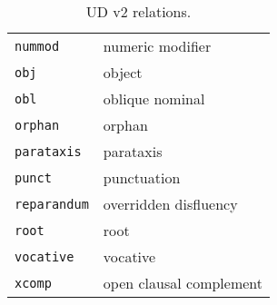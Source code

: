 \documentclass[11pt,a4paper]{article}
\begin{document}
\begin{table}[h]
\begin{tabular}{ll}
\texttt{nummod} & numeric modifier \\
\texttt{obj} & object \\
\texttt{obl} & oblique nominal \\
\texttt{orphan} & orphan \\
\texttt{parataxis} & parataxis \\
\texttt{punct} & punctuation \\
\texttt{reparandum} & overridden disfluency \\
\texttt{root} & root \\
\texttt{vocative} & vocative \\
\texttt{xcomp} & open clausal complement
\end{tabular}
\caption{UD v2 relations.\label{tab:ud}}
\end{table}





\end{document}
